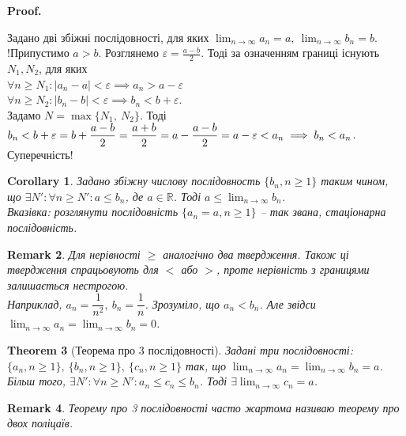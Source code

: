 \documentclass[a4paper, 14pt]{article}
\makeatletter
\def\qed{$\blacksquare$}
\theoremstyle{theoremdd}
\newtheorem{theorem}{Theorem}[subsection]
\theoremstyle{theoremdd}
\theoremstyle{theoremdd}
\theoremstyle{theoremdd}
\theoremstyle{theoremdd}
\theoremstyle{theoremdd}
\newtheorem{remark}[theorem]{Remark}
\theoremstyle{theoremdd}
\theoremstyle{theoremdd}
\newtheorem{corollary}[theorem]{Corollary}
\renewenvironment{proof}[1][Proof.\\]{\par
\pushQED{\hfill \qed}%
\normalfont \topsep6\p@\@plus6\p@\relax
\trivlist
\item\relax
{\bfseries
#1\@addpunct{.}}\hspace\labelsep\ignorespaces
}{%
\popQED\endtrivlist\@endpefalse
}
\makeatother
\begin{document}
	\begin{proof}
	Задано дві збіжні послідовності, для яких $\displaystyle \lim_{n \to \infty} a_n =a, \ \lim_{n \to \infty} b_n = b$.\\
	!Припустимо $a>b$. Розглянемо $\displaystyle \varepsilon = \frac{a-b}{2}$. Тоді за означенням границі існують $N_1,N_2$, для яких\\
	$\forall n \geq N_1:|a_n-a|<\varepsilon \implies a_n>a-\varepsilon$\\
	$\forall n \geq N_2:|b_n-b|<\varepsilon \implies b_n<b+\varepsilon$.\\
	Задамо $N=\max \{N_1, \ N_2\}$. Тоді  $\displaystyle b_n < b+\varepsilon = b + \frac{a-b}{2}=\frac{a+b}{2}=a-\frac{a-b}{2} = a-\varepsilon<a_n \\ \implies b_n<a_n$. Суперечність!
	\end{proof}
	
	\begin{corollary}
	Задано збіжну числову послідовность $\{b_n, n \geq 1\}$ таким чином, що $\exists N': \forall n \geq N': a \leq b_n$, де $a \in \mathbb{R}$. Тоді $\displaystyle a \leq \lim_{n \to \infty} b_n$.\\
	\textit{Вказівка: розглянути послідовність $\{a_n = a, n \geq 1\}$ -- так звана, стаціонарна послідовність.}
	\end{corollary}
	
	\begin{remark}
	Для нерівності $\geq$ аналогічно два твердження. Також ці твердження спрацьовують для $<$ або $>$, проте нерівність з границями залишається нестрогою.\\
	Наприклад, $a_n = \dfrac{1}{n^2}, \ b_n = \dfrac{1}{n}$. Зрозуміло, що $a_n < b_n$. Але звідси $\displaystyle\lim_{n \to \infty} a_n = \displaystyle\lim_{n \to \infty} b_n = 0$.
	\end{remark}
	
	\begin{theorem}[Теорема про 3 послідовності]
	Задані три послідовності: $\{a_n, n \geq 1\}, \ \{b_n, n \geq 1\}, \ \{c_n, n \geq 1\}$ так, що $\displaystyle \lim_{n \to \infty} a_n = \displaystyle \lim_{n \to \infty} b_n = a$. Більш того, $\exists N': \forall n \geq N': a_n \leq c_n \leq b_n$.
	Тоді $\exists \displaystyle \lim_{n \to \infty} c_n = a$.
	\end{theorem}
	
	\begin{remark}
	Теорему про 3 послідовності часто жартома називаю \textit{теорему про двох поліцаїв}.
	\end{remark}
	
\end{document}
